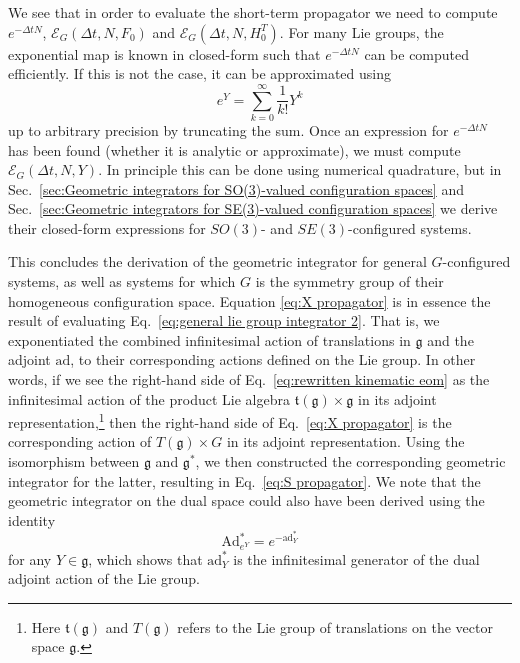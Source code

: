 We see that in order to evaluate the short-term propagator we need to compute $e^{- \Delta t N}$, $\mathscr{E}_G(\Delta t, N, F_0)$ and $\mathscr{E}_G(\Delta t, N, H_0^T)$. For many Lie groups, the exponential map is known in closed-form such that $e^{- \Delta t N}$ can be computed efficiently. If this is not the case, it can be approximated using
\begin{equation}
e^{Y} = \sum_{k=0}^\infty \frac{1}{k!} Y^k
\end{equation}
up to arbitrary precision by truncating the sum. Once an expression for $e^{- \Delta t N}$ has been found (whether it is analytic or approximate), we must compute $\mathscr{E}_G(\Delta t, N, Y)$. In principle this can be done using numerical quadrature, but in Sec.~\ref{sec:Geometric integrators for SO(3)-valued configuration spaces} and Sec.~\ref{sec:Geometric integrators for SE(3)-valued configuration spaces} we derive their closed-form expressions for $SO(3)$- and $SE(3)$-configured systems. 

This concludes the derivation of the geometric integrator for general $G$-configured systems, as well as systems for which $G$ is the symmetry group of their homogeneous configuration space. Equation \ref{eq:X propagator} is in essence the result of evaluating Eq.~\ref{eq:general lie group integrator 2}. That is, we exponentiated the combined infinitesimal action of translations in $\mathfrak{g}$ and the adjoint $\text{ad}$, to their corresponding actions defined on the Lie group. In other words, if we see the right-hand side of Eq.~\ref{eq:rewritten kinematic eom} as the infinitesimal action of the product Lie algebra $\mathfrak{t}(\mathfrak{g}) \times \mathfrak{g}$ in its adjoint representation,\footnote{Here $\mathfrak{t}(\mathfrak{g})$ and $T(\mathfrak{g})$ refers to the Lie group of translations on the vector space $\mathfrak{g}$.} then the right-hand side of Eq.~\ref{eq:X propagator} is the corresponding action of $T(\mathfrak{g}) \times G$ in its adjoint representation. Using the isomorphism between $\mathfrak{g}$ and $\mathfrak{g}^*$, we then constructed the corresponding geometric integrator for the latter, resulting in Eq.~\ref{eq:S propagator}. We note that the geometric integrator on the dual space could also have been derived using the identity \citep{rossmannLieGroupsIntroduction2006}
\begin{equation}
	\text{Ad}_{e^{Y}}^* = e^{ -\text{ad}^*_{Y} }
\end{equation}
for any $Y \in \mathfrak{g}$, which shows that $\text{ad}^*_{Y}$ is the infinitesimal generator of the dual adjoint action of the Lie group.

